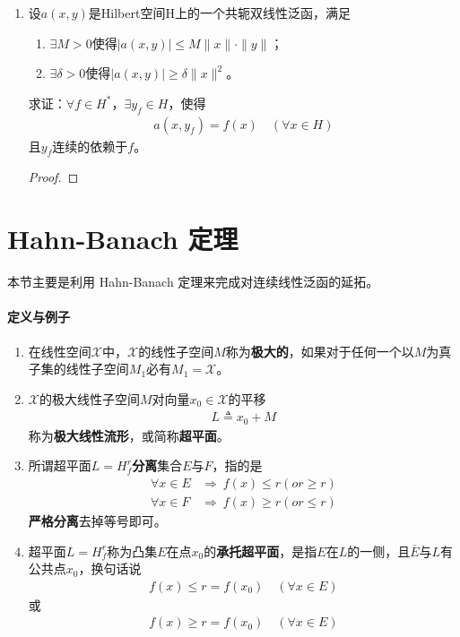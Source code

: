\begin{enumerate}[leftmargin=2cm, label=\arabic*]
		\item 设$a(x,y)$是Hilbert空间H上的一个共轭双线性泛函，满足
		\begin{enumerate}[leftmargin=1cm, label=(\arabic*)]
			\item $\exists M>0$使得$|a(x,y)| \leqslant M\|x\|\cdot\|y\|$；
			\item $\exists \delta>0$使得$|a(x,y)| \geqslant \delta \|x\|^2$。
		\end{enumerate}
		求证：$\forall f\in H^*$，$\exists y_f\in H$，使得
		\begin{align*}
			a(x,y_f) = f(x) \quad (\forall x\in H)
		\end{align*}
		且$y_f$连续的依赖于$f$。
		\begin{proof}
			
		\end{proof}
		
		
	\end{enumerate}
	
	\section{Hahn-Banach 定理}
	本节主要是利用 Hahn-Banach 定理来完成对连续线性泛函的延拓。
	\paragraph{定义与例子}
	\begin{enumerate}[leftmargin=2cm, label=\arabic*]
		\item 在线性空间$\mathscr{X}$中，$\mathscr{X}$的线性子空间$M$称为\textbf{极大的}，如果对于任何一个以$M$为真子集的线性子空间$M_1$必有$M_1 = \mathscr{X}$。
		\item $\mathscr{X}$的极大线性子空间$M$对向量$x_0\in\mathscr{X}$的平移
		\begin{align*}
			L \triangleq x_0 + M
		\end{align*}
		称为\textbf{极大线性流形}，或简称\textbf{超平面}。
		\item 所谓超平面$L = H_f^r$\textbf{分离}集合$E$与$F$，指的是
		\begin{align*}
			\forall x\in E&\Longrightarrow\ f(x)\leqslant r (or \geqslant r) \\
			\forall x\in F&\Longrightarrow\ f(x)\geqslant r (or \leqslant r)
		\end{align*}
		\textbf{严格分离}去掉等号即可。
		
		\item 超平面$L = H_f^r$称为凸集$E$在点$x_0$的\textbf{承托超平面}，是指$E$在$L$的一侧，且$\overline{E}$与$L$有公共点$x_0$，换句话说
		\begin{align*}
			f(x) \leqslant r = f(x_0)\quad (\forall x\in E)
		\end{align*}
		或
		\begin{align*}
			f(x) \geqslant r = f(x_0)\quad (\forall x\in E)
		\end{align*}
		
		
		
	\end{enumerate}
	
